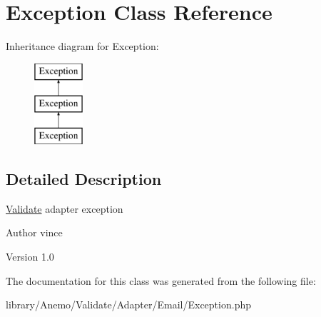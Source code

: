 \hypertarget{class_anemo_1_1_validate_1_1_adapter_1_1_email_1_1_exception}{
\section{Exception Class Reference}
\label{class_anemo_1_1_validate_1_1_adapter_1_1_email_1_1_exception}
}
Inheritance diagram for Exception:\begin{figure}[H]
\begin{center}
\leavevmode
\includegraphics[height=3.000000cm]{class_anemo_1_1_validate_1_1_adapter_1_1_email_1_1_exception}
\end{center}
\end{figure}


\subsection{Detailed Description}
\hyperlink{class_anemo_1_1_validate}{Validate} adapter exception \begin{DoxyAuthor}{Author}
vince 
\end{DoxyAuthor}
\begin{DoxyVersion}{Version}
1.0 
\end{DoxyVersion}


The documentation for this class was generated from the following file:\begin{DoxyCompactItemize}
\item 
library/Anemo/Validate/Adapter/Email/Exception.php\end{DoxyCompactItemize}
